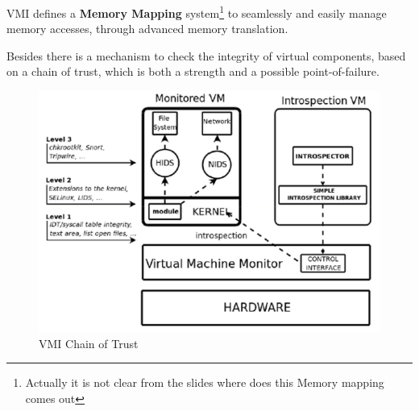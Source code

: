 VMI defines a \textbf{Memory Mapping} system\footnote{Actually it is not clear from the slides where does this Memory mapping comes out} to seamlessly and easily manage memory accesses,
through advanced memory translation.

Besides there is a mechanism to check the integrity of virtual components,
based on a chain of trust,
which is both a strength and a possible point-of-failure.

\begin{figure}[htbp]
   \centering
   \includegraphics{images/VMI_trustchain.png}
   \caption{VMI Chain of Trust}
   \label{fig:VMI_trustchain.png}
\end{figure}